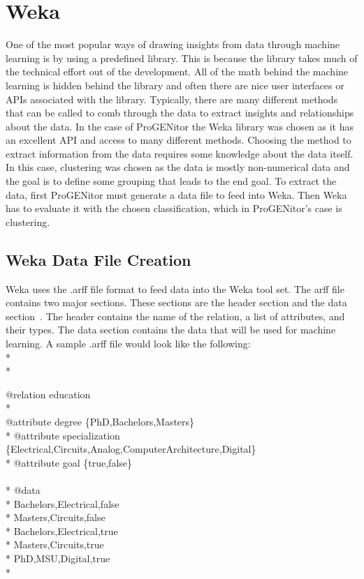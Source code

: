 \section{Weka}
\label{sect:weka}
One of the most popular ways of drawing insights from data through machine
learning is by using a predefined library.  This is because the library takes
much of the technical effort out of the development.  All of the math behind the
machine learning is hidden behind the library and often there are nice user
interfaces or APIs associated with the library.  Typically, there are many
different methods that can be called to comb through the data to extract
insights and relationships about the data.  In the case of ProGENitor the Weka
library was chosen as it has an excellent API and access to many different
methods.  Choosing the method to extract information from the data requires some
knowledge about the data itself.  In this case, clustering was chosen as the
data is mostly non-numerical data and the goal is to define some grouping that
leads to the end goal.  To extract the data, first ProGENitor must generate a data
file to feed into Weka.  Then Weka has to evaluate it with the chosen
classification, which in ProGENitor's case is clustering.

\subsection{Weka Data File Creation}
Weka uses the .arff file format to feed data into the Weka tool set.  The arff
file contains two major sections.  These sections are the header section and the
data section~\cite{arff}.  The header contains the name of the relation, a list
of attributes, and their types.  The data section contains the data that will
be used for machine learning.  A sample .arff file would look like the
following:\\*
\\*
\begin{tt}
\begin{footnotesize}
@relation education\\*
\\
@attribute degree \{PhD,Bachelors,Masters\}\\*
@attribute specialization
\{Electrical,Circuits,Analog,Computer\newline \indent Architecture,Digital\}\\*
@attribute goal \{true,false\}\\ \\* @data\\*
Bachelors,Electrical,false\\*
Masters,Circuits,false\\*
Bachelors,Electrical,true\\*
Masters,Circuits,true\\*
PhD,MSU,Digital,true\\*
\end{footnotesize}
\end{tt}

